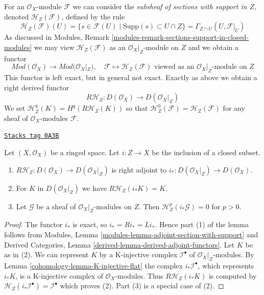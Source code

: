 \medskip\noindent
For an $\mathcal{O}_X$-module $\mathcal{F}$ we can consider the
{\it subsheaf of sections with support in $Z$}, denoted
$\mathcal{H}_Z(\mathcal{F})$, defined by the rule
$$
\mathcal{H}_Z(\mathcal{F})(U) =
\{s \in \mathcal{F}(U) \mid \text{Supp}(s) \subset U \cap Z\} =
\Gamma_{Z \cap U}(U, \mathcal{F}|_U)
$$
As discussed in
Modules, Remark \ref{modules-remark-sections-support-in-closed-modules}
we may view $\mathcal{H}_Z(\mathcal{F})$ as an $\mathcal{O}_X|_Z$-module
on $Z$ and we obtain a functor
$$
\textit{Mod}(\mathcal{O}_X) \longrightarrow \textit{Mod}(\mathcal{O}_X|_Z),
\quad
\mathcal{F} \longmapsto \mathcal{H}_Z(\mathcal{F})
\text{ viewed as an }\mathcal{O}_X|_Z\text{-module on }Z
$$
This functor is left exact, but in general not exact. Exactly as above
we obtain a right derived functor
$$
R\mathcal{H}_Z : D(\mathcal{O}_X) \longrightarrow D(\mathcal{O}_X|_Z)
$$
We set $\mathcal{H}^q_Z(K) = H^q(R\mathcal{H}_Z(K))$ so that
$\mathcal{H}^0_Z(\mathcal{F}) = \mathcal{H}_Z(\mathcal{F})$
for any sheaf of $\mathcal{O}_X$-modules $\mathcal{F}$.

\begin{lemma}
\label{cohomology-lemma-cohomology-with-support-sheaf-on-support}
\href{https://stacks.math.columbia.edu/tag/0A3B}{\texttt{Stacks tag 0A3B}}

Let $(X, \mathcal{O}_X)$ be a ringed space. Let $i : Z \to X$ be the
inclusion of a closed subset.
\begin{enumerate}
\item $R\mathcal{H}_Z : D(\mathcal{O}_X) \to D(\mathcal{O}_X|_Z)$
is right adjoint to $i_* : D(\mathcal{O}_X|_Z) \to D(\mathcal{O}_X)$.
\item For $K$ in $D(\mathcal{O}_X|_Z)$ we have $R\mathcal{H}_Z(i_*K) = K$.
\item Let $\mathcal{G}$ be a sheaf of
$\mathcal{O}_X|_Z$-modules on $Z$. Then
$\mathcal{H}^p_Z(i_*\mathcal{G}) = 0$ for $p > 0$.
\end{enumerate}
\end{lemma}

\begin{proof}

The functor $i_*$ is exact, so $i_* = Ri_* = Li_*$. Hence part (1)
of the lemma follows from
Modules, Lemma \ref{modules-lemma-adjoint-section-with-support}
and
Derived Categories, Lemma \ref{derived-lemma-derived-adjoint-functors}.
Let $K$ be as in (2). We can represent $K$ by a K-injective complex
$\mathcal{I}^\bullet$ of $\mathcal{O}_X|_Z$-modules. By
Lemma \ref{cohomology-lemma-K-injective-flat}
the complex $i_*\mathcal{I}^\bullet$, which represents $i_*K$,
is a K-injective complex of $\mathcal{O}_X$-modules. Thus
$R\mathcal{H}_Z(i_*K)$ is computed by
$\mathcal{H}_Z(i_*\mathcal{I}^\bullet) = \mathcal{I}^\bullet$
which proves (2). Part (3) is a special case of (2).
\end{proof}


